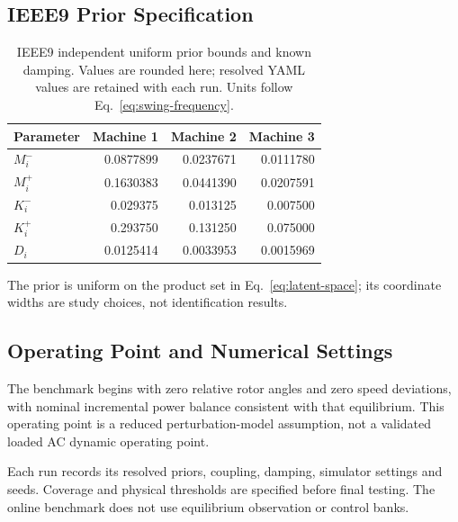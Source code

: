 \documentclass[journal]{IEEEtran}
\begin{document}
\subsection{IEEE9 Prior Specification}
\begin{table}[t]
\caption{IEEE9 independent uniform prior bounds and known damping. Values are rounded here; resolved YAML values are retained with each run. Units follow Eq.~\eqref{eq:swing-frequency}.}
\centering
\begin{tabular}{lrrr}
\toprule Parameter & Machine 1 & Machine 2 & Machine 3\\
\midrule
$M_i^-$ & 0.0877899 & 0.0237671 & 0.0111780\\
$M_i^+$ & 0.1630383 & 0.0441390 & 0.0207591\\
$K_i^-$ & 0.029375 & 0.013125 & 0.007500\\
$K_i^+$ & 0.293750 & 0.131250 & 0.075000\\
$D_i$ & 0.0125414 & 0.0033953 & 0.0015969\\
\bottomrule
\end{tabular}
\end{table}
The prior is uniform on the product set in Eq.~\eqref{eq:latent-space};
its coordinate widths are study choices, not identification results.

\subsection{Operating Point and Numerical Settings}
The benchmark begins with zero relative rotor angles and zero speed deviations,
with nominal incremental power balance consistent with that equilibrium.
This operating point is a reduced perturbation-model assumption, not a
validated loaded AC dynamic operating point.

Each run records its resolved priors, coupling, damping, simulator settings
and seeds. Coverage and physical thresholds are specified before final testing.
The online benchmark does not use equilibrium observation or control banks.
\end{document}

